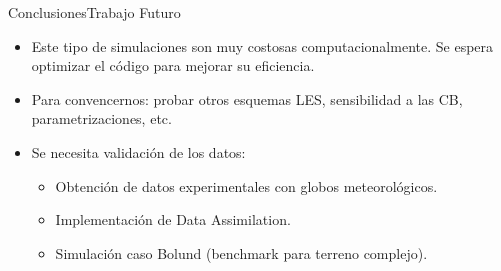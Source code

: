 \documentclass[mathserif]{beamer}
\begin{document}
\begin{frame}{Conclusiones}{Trabajo Futuro}
	\begin{itemize}\justifying
		\item Este tipo de simulaciones son muy costosas computacionalmente. Se espera optimizar el código para mejorar su eficiencia.
		\item Para convencernos: probar otros esquemas LES, sensibilidad a las CB, parametrizaciones, etc.
		\item Se necesita validación de los datos:
		\begin{itemize}
			\item Obtención de datos experimentales con globos meteorológicos.
			\item Implementación de Data Assimilation.
			\item Simulación caso Bolund (benchmark para terreno complejo).
		\end{itemize}
	\end{itemize}
\end{frame}

\begin{frame}
  \titlepage
\end{frame}
\end{document}
